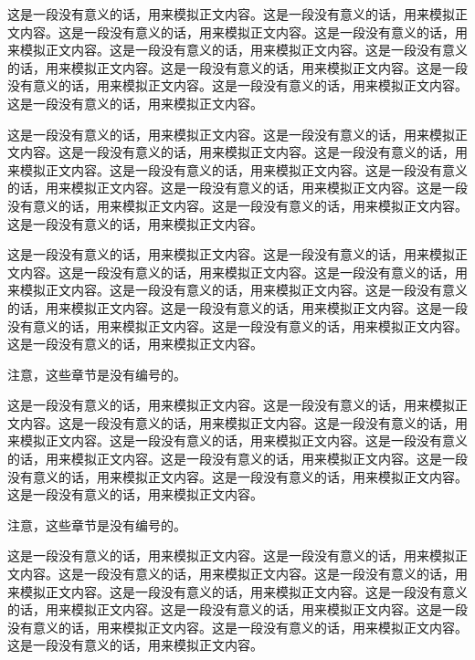 这是一段没有意义的话，用来模拟正文内容。这是一段没有意义的话，用来模拟正文内容。这是一段没有意义的话，用来模拟正文内容。这是一段没有意义的话，用来模拟正文内容。这是一段没有意义的话，用来模拟正文内容。这是一段没有意义的话，用来模拟正文内容。这是一段没有意义的话，用来模拟正文内容。这是一段没有意义的话，用来模拟正文内容。这是一段没有意义的话，用来模拟正文内容。这是一段没有意义的话，用来模拟正文内容。


这是一段没有意义的话，用来模拟正文内容。这是一段没有意义的话，用来模拟正文内容。这是一段没有意义的话，用来模拟正文内容。这是一段没有意义的话，用来模拟正文内容。这是一段没有意义的话，用来模拟正文内容。这是一段没有意义的话，用来模拟正文内容。这是一段没有意义的话，用来模拟正文内容。这是一段没有意义的话，用来模拟正文内容。这是一段没有意义的话，用来模拟正文内容。这是一段没有意义的话，用来模拟正文内容。



这是一段没有意义的话，用来模拟正文内容。这是一段没有意义的话，用来模拟正文内容。这是一段没有意义的话，用来模拟正文内容。这是一段没有意义的话，用来模拟正文内容。这是一段没有意义的话，用来模拟正文内容。这是一段没有意义的话，用来模拟正文内容。这是一段没有意义的话，用来模拟正文内容。这是一段没有意义的话，用来模拟正文内容。这是一段没有意义的话，用来模拟正文内容。这是一段没有意义的话，用来模拟正文内容。




注意，这些章节是没有编号的。

这是一段没有意义的话，用来模拟正文内容。这是一段没有意义的话，用来模拟正文内容。这是一段没有意义的话，用来模拟正文内容。这是一段没有意义的话，用来模拟正文内容。这是一段没有意义的话，用来模拟正文内容。这是一段没有意义的话，用来模拟正文内容。这是一段没有意义的话，用来模拟正文内容。这是一段没有意义的话，用来模拟正文内容。这是一段没有意义的话，用来模拟正文内容。这是一段没有意义的话，用来模拟正文内容。


注意，这些章节是没有编号的。

这是一段没有意义的话，用来模拟正文内容。这是一段没有意义的话，用来模拟正文内容。这是一段没有意义的话，用来模拟正文内容。这是一段没有意义的话，用来模拟正文内容。这是一段没有意义的话，用来模拟正文内容。这是一段没有意义的话，用来模拟正文内容。这是一段没有意义的话，用来模拟正文内容。这是一段没有意义的话，用来模拟正文内容。这是一段没有意义的话，用来模拟正文内容。这是一段没有意义的话，用来模拟正文内容。

